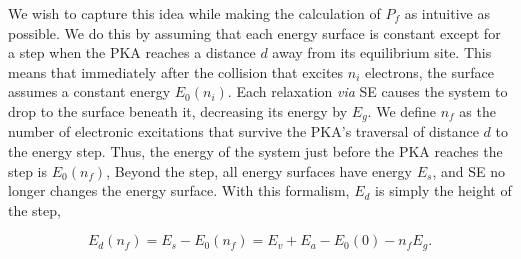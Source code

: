 \documentclass{article}
\begin{document}
We wish to capture this idea while making the calculation of $P_f$ as
intuitive as possible.
We do this by assuming that each energy surface is constant except for a step
when the PKA reaches a distance $d$ away from its equilibrium site.
This means that immediately after the collision that excites $n_i$ electrons,
the surface assumes a constant energy $E_0(n_i)$.
Each relaxation \textit{via} SE causes the system to drop to the surface beneath it,
decreasing its energy by $E_g$.
We define $n_f$ as the number of electronic excitations that survive the PKA's
traversal of distance $d$ to the energy step.
Thus, the energy of the system just before the PKA reaches the step is
$E_0(n_f)$,
Beyond the step, all energy surfaces have energy $E_s$, and SE no longer
changes the energy surface. 
With this formalism, $E_d$ is simply the height of the step,

\begin{equation}
  E_d(n_f) = E_s - E_0(n_f) = E_v + E_a - E_0(0) - n_f E_g.
  \label{eq:Ed}
\end{equation}
\end{document}
